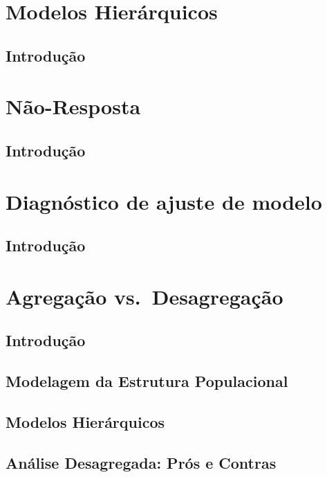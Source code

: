 \documentclass[]{book}
\theoremstyle{definition}
\theoremstyle{definition}
\theoremstyle{definition}
\theoremstyle{remark}
\begin{document}
\chapter{Modelos Hierárquicos}\label{modelos-hierarquicos}

\section{Introdução}\label{introducao-4}

\chapter{Não-Resposta}\label{nao-resposta}

\section{Introdução}\label{introducao-5}

\chapter{Diagnóstico de ajuste de
modelo}\label{diagnostico-de-ajuste-de-modelo}

\section{Introdução}\label{introducao-6}

\chapter{Agregação vs.~Desagregação}\label{agregdesag}

\section{Introdução}\label{introducao-7}

\section{Modelagem da Estrutura
Populacional}\label{modelagem-da-estrutura-populacional}

\section{Modelos Hierárquicos}\label{modelos-hierarquicos-1}

\section{Análise Desagregada: Prós e
Contras}\label{analise-desagregada-pros-e-contras}
\end{document}
